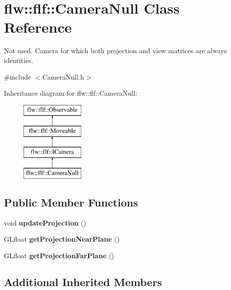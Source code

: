 \hypertarget{classflw_1_1flf_1_1CameraNull}{}\section{flw\+:\+:flf\+:\+:Camera\+Null Class Reference}
\label{classflw_1_1flf_1_1CameraNull}


Not used. Camera for which both projection and view matrices are always identities.  




{\ttfamily \#include $<$Camera\+Null.\+h$>$}

Inheritance diagram for flw\+:\+:flf\+:\+:Camera\+Null\+:\begin{figure}[H]
\begin{center}
\leavevmode
\includegraphics[height=4.000000cm]{classflw_1_1flf_1_1CameraNull}
\end{center}
\end{figure}
\subsection*{Public Member Functions}
\begin{DoxyCompactItemize}
\item 
\mbox{\label{classflw_1_1flf_1_1CameraNull_ae8a26e5e560067bd9a84387a863d38f5}} 
void {\bfseries update\+Projection} ()
\item 
\mbox{\label{classflw_1_1flf_1_1CameraNull_a6ccddc568aba10bb69c05dadf8b3c89a}} 
G\+Lfloat {\bfseries get\+Projection\+Near\+Plane} ()
\item 
\mbox{\label{classflw_1_1flf_1_1CameraNull_a09741d600721440c3330d6404c2874d7}} 
G\+Lfloat {\bfseries get\+Projection\+Far\+Plane} ()
\end{DoxyCompactItemize}
\subsection*{Additional Inherited Members}


